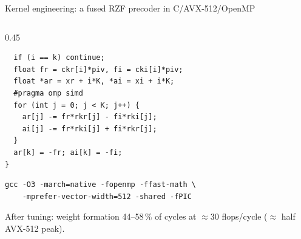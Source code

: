 \documentclass[aspectratio=169,10pt,xcolor={table,dvipsnames}]{beamer}
\begin{document}
\begin{frame}[fragile]{Kernel engineering: a fused RZF precoder in C/AVX-512/OpenMP}
\begin{columns}[T]
\begin{column}{0.45\textwidth}
\begin{tcolorbox}[enhanced,colback=ink!4,colframe=ink!30,boxrule=0.4pt,arc=2pt,left=3pt,right=3pt,top=1pt,bottom=1pt]
\begin{verbatim}
  if (i == k) continue;
  float fr = ckr[i]*piv, fi = cki[i]*piv;
  float *ar = xr + i*K, *ai = xi + i*K;
  #pragma omp simd
  for (int j = 0; j < K; j++) {
    ar[j] -= fr*rkr[j] - fi*rki[j];
    ai[j] -= fr*rki[j] + fi*rkr[j];
  }
  ar[k] = -fr; ai[k] = -fi;
}
\end{verbatim}
\end{tcolorbox}
\begin{tcolorbox}[enhanced,colback=ink!4,colframe=ink!30,boxrule=0.4pt,arc=2pt,left=3pt,right=3pt,top=1pt,bottom=1pt]
\tiny
\begin{verbatim}
gcc -O3 -march=native -fopenmp -ffast-math \
    -mprefer-vector-width=512 -shared -fPIC
\end{verbatim}
\end{tcolorbox}
\footnotesize After tuning: weight formation 44--58\,\% of cycles at $\approx$30 flops/cycle ($\approx$ half AVX-512 peak).
\end{column}
\end{columns}
\end{frame}
\end{document}
